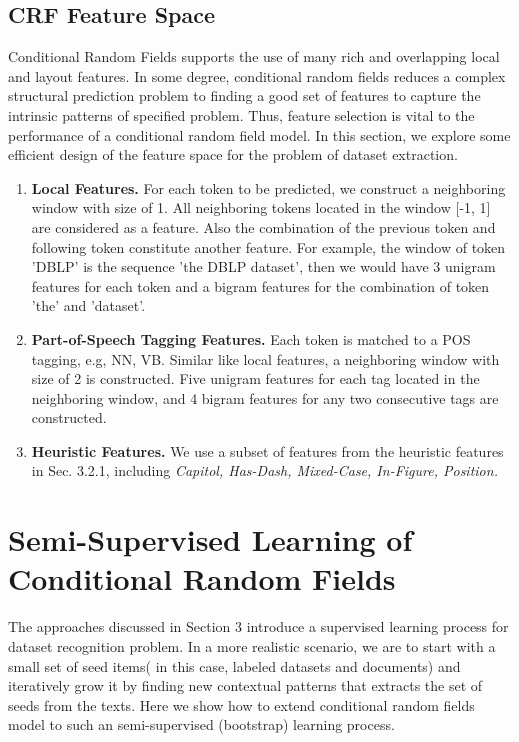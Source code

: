 \documentclass[11pt]{article}
\begin{document}
\subsection{CRF Feature Space}
Conditional Random Fields supports the use of many rich and overlapping local and layout features. In some degree, conditional random fields reduces a complex structural prediction problem to finding a good set of features to capture the intrinsic patterns of specified problem. Thus, feature selection is vital to the performance of a conditional random field model. In this section, we explore some efficient design of the feature space for the problem of dataset extraction.
\begin{enumerate}
\item \textbf{Local Features.} For each token to be predicted, we construct a neighboring window with size of 1. All neighboring tokens located in the window [-1, 1] are considered as a feature. Also the combination of the previous token and following token constitute another feature. For example, the window of token 'DBLP' is the sequence 'the DBLP dataset', then we would have 3 unigram features for each token and a bigram features for the combination of token 'the' and 'dataset'.  
\item \textbf{Part-of-Speech Tagging Features.} Each token is matched to a POS tagging, e.g, NN, VB. Similar like local features, a neighboring window with size of 2 is constructed. Five unigram features for each tag located in the neighboring window, and 4 bigram features for any two consecutive tags are constructed.  
\item \textbf{Heuristic Features.} We use a subset of features from the heuristic features in Sec. 3.2.1, including \textit{Capitol, Has-Dash, Mixed-Case, In-Figure, Position. } 
\end{enumerate}

\section{Semi-Supervised Learning of Conditional Random Fields}
The approaches discussed in Section 3 introduce a supervised learning process for dataset recognition problem. In a more realistic scenario, we are to start with a small set of seed items( in this case, labeled datasets and documents) and iteratively grow it by finding new contextual patterns that extracts the set of seeds from the texts. Here we show how to extend conditional random fields model to such an semi-supervised (bootstrap) learning process. 
\end{document}

